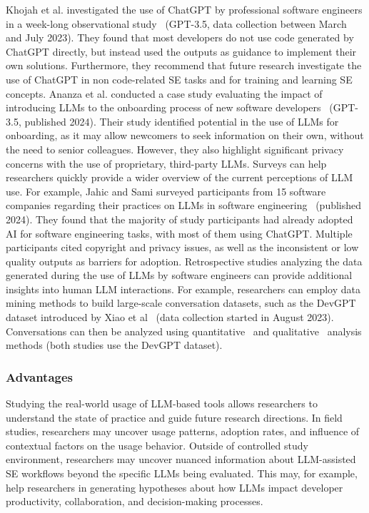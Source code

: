 Khojah et al. investigated the use of ChatGPT by professional software engineers in a week-long observational study~\cite{DBLP:journals/pacmse/KhojahM0N24} (GPT-3.5, data collection between March and July 2023).
They found that most developers do not use code generated by ChatGPT directly, but instead used the outputs as guidance to implement their own solutions.
Furthermore, they recommend that future research investigate the use of ChatGPT in non code-related SE tasks and for training and learning SE concepts.
Ananza et al. conducted a case study evaluating the impact of introducing LLMs to the onboarding process of new software developers~\cite{DBLP:conf/csee/AzanzaPIG24} (GPT-3.5, published 2024).
Their study identified potential in the use of LLMs for onboarding, as it may allow newcomers to seek information on their own, without the need to  senior colleagues.
However, they also highlight significant privacy concerns with the use of proprietary, third-party LLMs.
Surveys can help researchers quickly provide a wider overview of the current perceptions of LLM use.
For example, Jahic and Sami surveyed participants from 15 software companies regarding their practices on LLMs in software engineering~\cite{DBLP:conf/icsa/JahicS24} (published 2024).
They found that the majority of study participants had already adopted AI for software engineering tasks, with most of them using ChatGPT.
Multiple participants cited copyright and privacy issues, as well as the inconsistent or low quality outputs as barriers for adoption.
Retrospective studies analyzing the data generated during the use of LLMs by software engineers can provide additional insights into human LLM interactions.
For example, researchers can employ data mining methods to build large-scale conversation datasets, such as the DevGPT dataset introduced by Xiao et al~\cite{DBLP:conf/msr/XiaoTHM24} (data collection started in August 2023).
Conversations can then be analyzed using quantitative~\cite{DBLP:conf/msr/RabbiCZI24} and qualitative~\cite{DBLP:conf/msr/MohamedPP24} analysis methods (both studies use the DevGPT dataset).

\subsubsection{Advantages}

Studying the real-world usage of LLM-based tools allows researchers to understand the state of practice and guide future research directions.
In field studies, researchers may uncover usage patterns, adoption rates, and influence of contextual factors on the usage behavior.
Outside of controlled study environment, researchers may uncover nuanced information about LLM-assisted SE workflows beyond the specific LLMs being evaluated.
This may, for example, help researchers in generating hypotheses about how LLMs impact developer productivity, collaboration, and decision-making processes.

